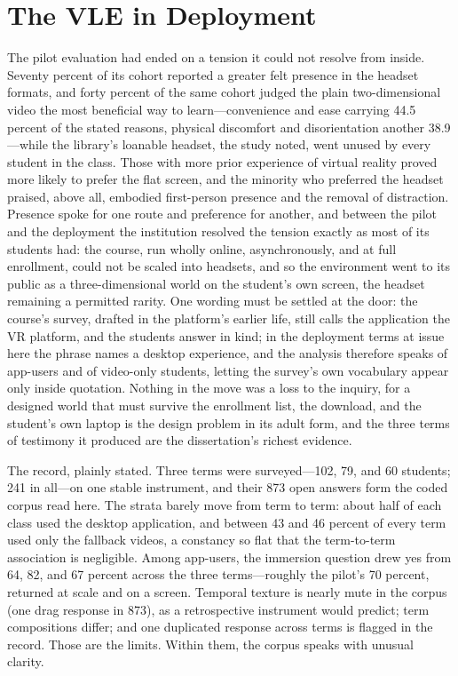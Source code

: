 
\section{The VLE in Deployment}

The pilot evaluation had ended on a tension it could not resolve from inside. Seventy percent of its cohort reported a greater felt presence in the headset formats, and forty percent of the same cohort judged the plain two-dimensional video the most beneficial way to learn---convenience and ease carrying 44.5 percent of the stated reasons, physical discomfort and disorientation another 38.9---while the library's loanable headset, the study noted, went unused by every student in the class. Those with more prior experience of virtual reality proved more likely to prefer the flat screen, and the minority who preferred the headset praised, above all, embodied first-person presence and the removal of distraction. Presence spoke for one route and preference for another, and between the pilot and the deployment the institution resolved the tension exactly as most of its students had: the course, run wholly online, asynchronously, and at full enrollment, could not be scaled into headsets, and so the environment went to its public as a three-dimensional world on the student's own screen, the headset remaining a permitted rarity. One wording must be settled at the door: the course's survey, drafted in the platform's earlier life, still calls the application the VR platform, and the students answer in kind; in the deployment terms at issue here the phrase names a desktop experience, and the analysis therefore speaks of app-users and of video-only students, letting the survey's own vocabulary appear only inside quotation. Nothing in the move was a loss to the inquiry, for a designed world that must survive the enrollment list, the download, and the student's own laptop is the design problem in its adult form, and the three terms of testimony it produced are the dissertation's richest evidence.

The record, plainly stated. Three terms were surveyed---102, 79, and 60 students; 241 in all---on one stable instrument, and their 873 open answers form the coded corpus read here. The strata barely move from term to term: about half of each class used the desktop application, and between 43 and 46 percent of every term used only the fallback videos, a constancy so flat that the term-to-term association is negligible. Among app-users, the immersion question drew yes from 64, 82, and 67 percent across the three terms---roughly the pilot's 70 percent, returned at scale and on a screen. Temporal texture is nearly mute in the corpus (one drag response in 873), as a retrospective instrument would predict; term compositions differ; and one duplicated response across terms is flagged in the record. Those are the limits. Within them, the corpus speaks with unusual clarity.

